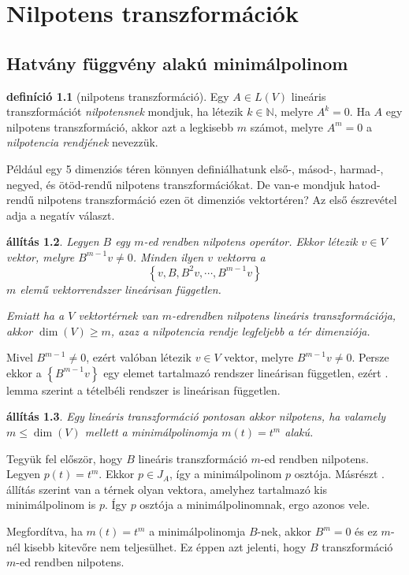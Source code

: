 \documentclass[a4paper, showtrims]{memoir}
\makeatletter
\renewenvironment{proof}[1][\proofname]
    {\par\pushQED{\qed}%
    \normalfont \topsep6\p@\@plus6\p@\relax
    \trivlist
    \item[\hskip\labelsep
        \itshape
    #1\@addpunct{:}]\ignorespaces}
    {\popQED\endtrivlist\@endpefalse}
\theoremstyle{plain}
\newtheorem{proposition}{állítás}[chapter]
\theoremstyle{remark}
\theoremstyle{definition}
\newtheorem{definition}[proposition]{definíció}
\makeatother
\begin{document}
\chapter{Nilpotens transzformációk}
\section{Hatvány függvény alakú minimálpolinom}
\begin{definition}[nilpotens transzformáció]
	Egy $A\in L\left( V \right)$ lineáris transzformációt
	\emph{nilpotensnek} mondjuk, ha
	létezik $k\in\mathbb{N}$, melyre $A^k=0$.
	Ha $A$ egy nilpotens transzformáció, akkor azt a legkisebb $m$ számot, melyre $A^m=0$ a \emph{nilpotencia rendjének} nevezzük.
\end{definition}

Például egy 5 dimenziós téren könnyen definiálhatunk első-, másod-, harmad-, negyed, és ötöd-rendű nilpotens transzformációkat.
De van-e mondjuk hatod-rendű nilpotens transzformáció ezen öt dimenziós vektortéren?
Az első észrevétel adja a negatív választ.
\begin{proposition}
	Legyen $B$ egy $m$-ed rendben nilpotens operátor.
	Ekkor létezik $v\in V$ vektor,
	melyre $B^{m-1}v\neq 0$.
	Minden ilyen $v$ vektorra a
	\[
		\left\{ v,B,B^2v,\cdots,B^{m-1}v \right\}
	\]
	$m$ elemű vektorrendszer lineárisan független.

	Emiatt ha a $V$ vektortérnek van $m$-edrendben nilpotens lineáris transzformációja, akkor $\dim(V)\geq m$,
	azaz a nilpotencia rendje legfeljebb a tér dimenziója.
	\label{th:fgtlen}
\end{proposition}
\begin{proof}
	Mivel $B^{m-1}\neq 0$, ezért valóban létezik $v\in V$ vektor,
	melyre $B^{m-1}v\neq 0$.
	Persze ekkor a $\left\{ B^{m-1}v \right\}$ egy elemet tartalmazó rendszer lineárisan független,
    ezért . lemma szerint a tételbéli rendszer is lineárisan független.
\end{proof}
\begin{proposition}
	Egy lineáris transzformáció pontosan akkor nilpotens,
	ha valamely $m\leq\dim(V)$ mellett a minimálpolinomja
	$m\left( t \right)=t^m$ alakú.
\end{proposition}
\begin{proof}
	Tegyük fel először, hogy $B$ lineáris transzformáció $m$-ed rendben
	nilpotens.
	Legyen $p\left( t \right)=t^m$.
	Ekkor $p\in J_A$, így a minimálpolinom $p$ osztója.
    Másrészt . állítás szerint van a térnek olyan vektora,
	amelyhez tartalmazó kis minimálpolinom is $p$.
	Így $p$ osztója a minimálpolinomnak, ergo azonos vele.

	Megfordítva, ha $m\left( t \right)=t^m$ a minimálpolinomja $B$-nek,
	akkor $B^m=0$ és ez $m$-nél kisebb kitevőre nem teljesülhet.
	Ez éppen azt jelenti, hogy $B$ transzformáció $m$-ed rendben nilpotens.
\end{proof}
\end{document}
